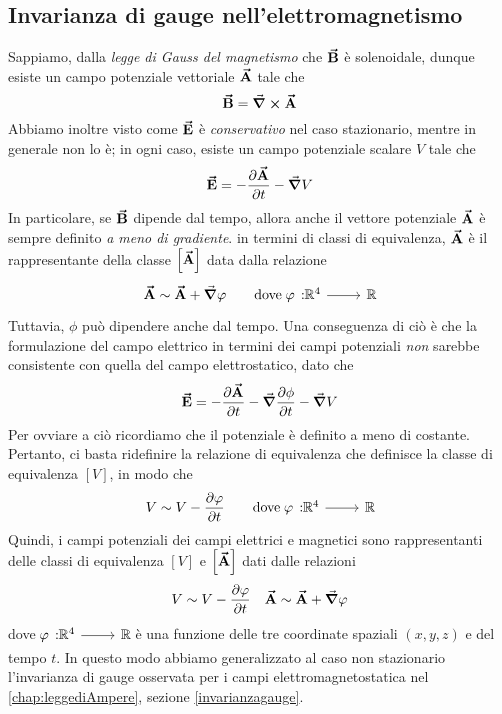 \subsection{Invarianza di gauge nell'elettromagnetismo}
Sappiamo, dalla \textit{legge di Gauss del magnetismo} che $\vb*{\va{B}}$ è solenoidale, dunque esiste un campo potenziale vettoriale $\vb*{\va{A}}$ tale che
\begin{equation*}
	\vb*{\va{B}}=\curl{\vb*{\va{A}}}
\end{equation*}
Abbiamo inoltre visto come $\vb*{\va{E}}$ è \textit{conservativo} nel caso stazionario, mentre in generale non lo è; in ogni caso, esiste un campo potenziale scalare $V$ tale che
\begin{equation*}
	\vb*{\va{E}}=-\pdv{\vb*{\va{A}}}{t}-\grad{V}
\end{equation*}
In particolare, se $\vb*{\va{B}}$ dipende dal tempo, allora anche il vettore potenziale $\vb*{\va{A}}$ è sempre definito \textit{a meno di gradiente}. in termini di classi di equivalenza, $\vb*{\va{A}}$ è il rappresentante della classe $\left[\vb*{\va{A}}\right]$ data dalla relazione
\begin{align*}
	\vba{A}\sim \vba{A}+\grad{\phi} \qquad \text{dove}\ \funz[\phi]{\realset^4}{\realset}
\end{align*}
Tuttavia, $\phi$ può dipendere anche dal tempo. Una conseguenza di ciò è che la formulazione del campo elettrico in termini dei campi potenziali \textit{non} sarebbe consistente con quella del campo elettrostatico, dato che
\begin{equation*}
	\vba{E}=-\pdv{\vba{A}}{t}-\grad{\pdv{\oldphi}{t}}-\grad{V}
\end{equation*}
Per ovviare a ciò ricordiamo che il potenziale è definito a meno di costante. Pertanto, ci basta ridefinire la relazione di equivalenza che definisce la classe di equivalenza $\left[V\right]$, in modo che
\begin{align*}
	V\sim V-\pdv{\phi}{t} \qquad \text{dove}\ \funz[\phi]{\realset^4}{\realset}
\end{align*}
Quindi, i campi potenziali dei campi elettrici e magnetici sono rappresentanti delle classi di equivalenza $\left[V\right]$ e $\left[\vb*{\va{A}}\right]$ dati dalle relazioni
\begin{align*}
	V\sim V-\pdv{\varphi}{t}&& \vb*{\va{A}}\sim \vb*{\va{A}}+\grad{\varphi}
\end{align*}
dove $\funz[\phi]{\realset^4}{\realset}$ è una funzione delle tre coordinate spaziali $(x,y,z)$ e del tempo $t$. In questo modo abbiamo generalizzato al caso non stazionario l'invarianza di gauge osservata per i campi elettromagnetostatica nel \autoref{chap:leggediAmpere}, sezione \ref{invarianzagauge}.\\
